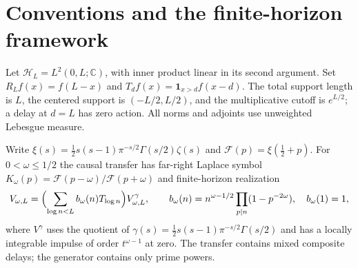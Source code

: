 \documentclass[11pt]{article}
\numberwithin{equation}{section}
\theoremstyle{definition}
\theoremstyle{remark}
\newcommand{\HH}{\mathcal H}
\newcommand{\CC}{\mathbb C}
\begin{document}
\section{Conventions and the finite-horizon framework}\label{sec:framework}

Let $\HH_L=L^2(0,L;\CC)$, with inner product linear in its second argument. Set $R_Lf(x)=f(L-x)$ and $T_df(x)=\mathbf1_{x>d}f(x-d)$. The total support length is $L$, the centered support is $(-L/2,L/2)$, and the multiplicative cutoff is $e^{L/2}$; a delay at $d=L$ has zero action. All norms and adjoints use unweighted Lebesgue measure.

Write $\xi(s)=\tfrac12s(s-1)\pi^{-s/2}\Gamma(s/2)\zeta(s)$ and $\mathscr F(p)=\xi(\tfrac12+p)$. For $0<\omega\le1/2$ the causal transfer has far-right Laplace symbol $K_\omega(p)=\mathscr F(p-\omega)/\mathscr F(p+\omega)$ and finite-horizon realization
\[
 V_{\omega,L}=\Bigl(\sum_{\log n<L}b_\omega(n)T_{\log n}\Bigr)V^\gamma_{\omega,L},\qquad
 b_\omega(n)=n^{\omega-1/2}\prod_{p\mid n}(1-p^{-2\omega}),\quad b_\omega(1)=1,
\]
where $V^\gamma$ uses the quotient of $\gamma(s)=\tfrac12s(s-1)\pi^{-s/2}\Gamma(s/2)$ and has a locally integrable impulse of order $t^{\omega-1}$ at zero. The transfer contains mixed composite delays; the generator contains only prime powers.
\end{document}
